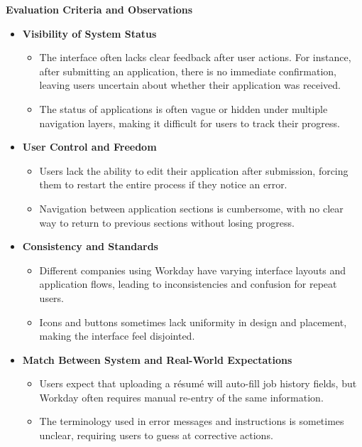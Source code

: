 \documentclass[
	letterpaper, %
]{jdf}
\begin{document}
\begin{sloppypar}
\textbf{Evaluation Criteria and Observations}  

\begin{itemize}
    \item \textbf{Visibility of System Status}  
    \begin{itemize}
        \item The interface often lacks clear feedback after user actions. For instance, after submitting an application, there is no immediate confirmation, leaving users uncertain about whether their application was received.
        \item The status of applications is often vague or hidden under multiple navigation layers, making it difficult for users to track their progress.
    \end{itemize}

    \item \textbf{User Control and Freedom}  
    \begin{itemize}
        \item Users lack the ability to edit their application after submission, forcing them to restart the entire process if they notice an error.
        \item Navigation between application sections is cumbersome, with no clear way to return to previous sections without losing progress.
    \end{itemize}

    \item \textbf{Consistency and Standards}  
    \begin{itemize}
        \item Different companies using Workday have varying interface layouts and application flows, leading to inconsistencies and confusion for repeat users.
        \item Icons and buttons sometimes lack uniformity in design and placement, making the interface feel disjointed.
    \end{itemize}

    \item \textbf{Match Between System and Real-World Expectations}  
    \begin{itemize}
        \item Users expect that uploading a résumé will auto-fill job history fields, but Workday often requires manual re-entry of the same information.
        \item The terminology used in error messages and instructions is sometimes unclear, requiring users to guess at corrective actions.
    \end{itemize}


\end{itemize}
\end{sloppypar}
\end{document}
